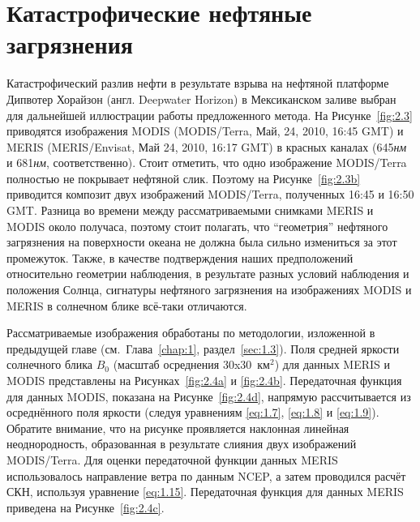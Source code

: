 \section{Катастрофические нефтяные загрязнения}

Катастрофический разлив нефти в результате взрыва на нефтяной платформе Дипвотер Хорайзон (англ. Deepwater Horizon) в Мексиканском заливе выбран для дальнейшей иллюстрации работы предложенного метода. На Рисунке~\ref{fig:2.3} приводятся изображения MODIS (MODIS/Terra, Май, 24, 2010, 16:45 GMT) и MERIS (MERIS/Envisat, Май 24, 2010, 16:17 GMT) в красных каналах (645\textit{нм} и 681\textit{нм}, соответственно). Стоит отметить, что одно изображение MODIS/Terra полностью не покрывает нефтяной слик. Поэтому на Рисунке~\ref{fig:2.3b} приводится композит двух изображений MODIS/Terra, полученных 16:45 и 16:50 GMT. Разница во времени между рассматриваемыми снимками MERIS и MODIS около получаса, поэтому стоит полагать, что ``геометрия'' нефтяного загрязнения на поверхности океана не должна была сильно измениться за этот промежуток. Также, в качестве подтверждения наших предположений относительно геометрии наблюдения, в результате разных условий наблюдения и положения Солнца, сигнатуры нефтяного загрязнения на изображениях MODIS и MERIS в солнечном блике всё-таки отличаются.

Рассматриваемые изображения обработаны по методологии, изложенной в предыдущей главе (см.~Глава~\ref{chap:1}, раздел~\ref{sec:1.3}). Поля средней яркости солнечного блика $B_{0} $ (масштаб осреднения 30x30~км${}^{2}$) для данных MERIS и MODIS представлены на Рисунках~\ref{fig:2.4a} и \ref{fig:2.4b}. Передаточная функция для данных MODIS, показана на Рисунке~\ref{fig:2.4d}, напрямую рассчитывается из осреднённого поля яркости (следуя уравнениям \eqref{eq:1.7}, \eqref{eq:1.8} и \eqref{eq:1.9}). Обратите внимание, что на рисунке проявляется наклонная линейная неоднородность, образованная в результате слияния двух изображений MODIS/Terra. Для оценки передаточной функции данных MERIS использовалось направление ветра по данным NCEP, а затем проводился расчёт СКН, используя уравнение \eqref{eq:1.15}. Передаточная функция для данных MERIS приведена на Рисунке~\ref{fig:2.4c}.



